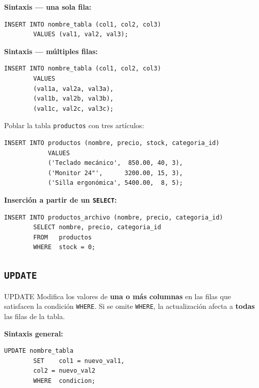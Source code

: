 \documentclass[12pt, a4paper]{article}
\begin{document}
	\textbf{Sintaxis — una sola fila:}
	
	\begin{lstlisting}[style=sql, caption={INSERT de una fila con columnas explícitas}]
		INSERT INTO nombre_tabla (col1, col2, col3)
		VALUES (val1, val2, val3);
	\end{lstlisting}
	
	\textbf{Sintaxis — múltiples filas:}
	
	\begin{lstlisting}[style=sql, caption={INSERT de varias filas en una sola sentencia}]
		INSERT INTO nombre_tabla (col1, col2, col3)
		VALUES
		(val1a, val2a, val3a),
		(val1b, val2b, val3b),
		(val1c, val2c, val3c);
	\end{lstlisting}
	
	\begin{ejemplo}
		Poblar la tabla \texttt{productos} con tres artículos:
		
		\begin{lstlisting}[style=sql, caption={Inserción múltiple en la tabla productos}]
			INSERT INTO productos (nombre, precio, stock, categoria_id)
			VALUES
			('Teclado mecánico',  850.00, 40, 3),
			('Monitor 24"',      3200.00, 15, 3),
			('Silla ergonómica', 5400.00,  8, 5);
		\end{lstlisting}
	\end{ejemplo}
	
	\textbf{Inserción a partir de un \texttt{SELECT}:}
	
	\begin{lstlisting}[style=sql, caption={INSERT ... SELECT: copiar filas desde otra tabla}]
		INSERT INTO productos_archivo (nombre, precio, categoria_id)
		SELECT nombre, precio, categoria_id
		FROM   productos
		WHERE  stock = 0;
	\end{lstlisting}
	
	\subsection{\texttt{UPDATE}}
	
	\begin{definicion}{UPDATE}
		Modifica los valores de \textbf{una o más columnas} en las filas que satisfacen
		la condición \texttt{WHERE}. Si se omite \texttt{WHERE}, la actualización afecta
		a \textbf{todas} las filas de la tabla.
	\end{definicion}
	
	\textbf{Sintaxis general:}
	
	\begin{lstlisting}[style=sql, caption={Sintaxis de UPDATE con WHERE}]
		UPDATE nombre_tabla
		SET    col1 = nuevo_val1,
		col2 = nuevo_val2
		WHERE  condicion;
	\end{lstlisting}
	
\end{document}
